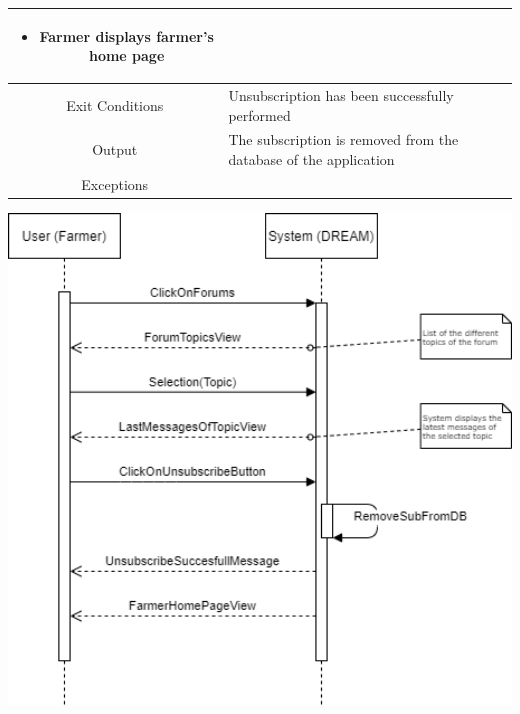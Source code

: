 \documentclass{article}
\begin{document}
\begin{center}
\begin{longtable}{|c| p{10cm}|}
\begin{itemize}
                                \item Farmer displays farmer’s home page
                            \end{itemize} \\
        \hline
            Exit Conditions & Unsubscription has been successfully performed \\
        \hline
            Output & The subscription is removed from the database of the application\\
        \hline
            Exceptions & \\
        \hline
    \end{longtable}
    
    \newpage
    
    \includegraphics[width=1.0\textwidth]{images/sequenceDiagrams/11. FarmerTopicUnsubscribe.png}
    \par
    \caption{\label{fig:frog}Farmer unsubscribes from a topic}

    \newpage
    
    
    
    
    
    

\end{center}
\end{document}
